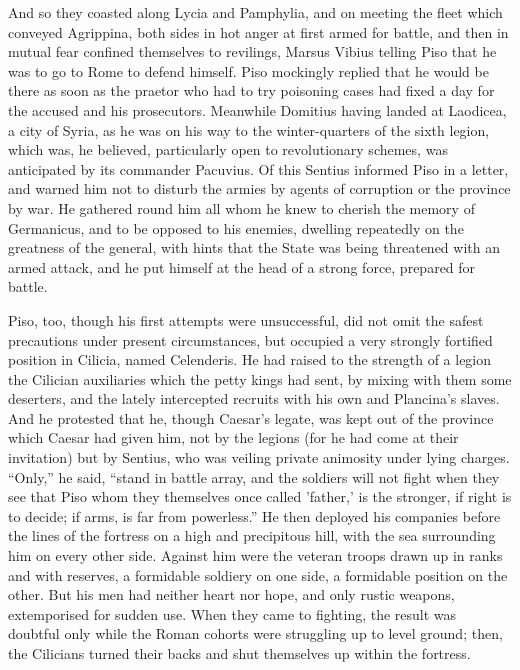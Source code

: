 
And so they coasted along Lycia and Pamphylia, and on meeting the fleet which conveyed Agrippina, both sides in hot anger at first armed for battle, and then in mutual fear confined themselves to revilings, Marsus Vibius telling Piso that he was to go to Rome to defend himself. Piso mockingly replied that he would be there as soon as the praetor who had to try poisoning cases had fixed a day for the accused and his prosecutors. Meanwhile Domitius having landed at Laodicea, a city of Syria, as he was on his way to the winter-quarters of the sixth legion, which was, he believed, particularly open to revolutionary schemes, was anticipated by its commander Pacuvius. Of this Sentius informed Piso in a letter, and warned him not to disturb the armies by agents of corruption or the province by war. He gathered round him all whom he knew to cherish the memory of Germanicus, and to be opposed to his enemies, dwelling repeatedly on the greatness of the general, with hints that the State was being threatened with an armed attack, and he put himself at the head of a strong force, prepared for battle.


Piso, too, though his first attempts were unsuccessful, did not omit the safest precautions under present circumstances, but occupied a very strongly fortified position in Cilicia, named Celenderis. He had raised to the strength of a legion the Cilician auxiliaries which the petty kings had sent, by mixing with them some deserters, and the lately intercepted recruits with his own and Plancina's slaves. And he protested that he, though Caesar's legate, was kept out of the province which Caesar had given him, not by the legions (for he had come at their invitation) but by Sentius, who was veiling private animosity under lying charges. ``Only,'' he said, ``stand in battle array, and the soldiers will not fight when they see that Piso whom they themselves once called 'father,' is the stronger, if right is to decide; if arms, is far from powerless.'' He then deployed his companies before the lines of the fortress on a high and precipitous hill, with the sea surrounding him on every other side. Against him were the veteran troops drawn up in ranks and with reserves, a formidable soldiery on one side, a formidable position on the other. But his men had neither heart nor hope, and only rustic weapons, extemporised for sudden use. When they came to fighting, the result was doubtful only while the Roman cohorts were struggling up to level ground; then, the Cilicians turned their backs and shut themselves up within the fortress.

